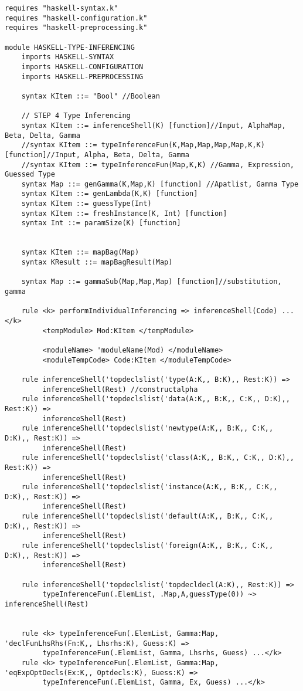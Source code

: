 \begin{lstlisting}
requires "haskell-syntax.k"
requires "haskell-configuration.k"
requires "haskell-preprocessing.k"

module HASKELL-TYPE-INFERENCING
    imports HASKELL-SYNTAX
    imports HASKELL-CONFIGURATION
    imports HASKELL-PREPROCESSING

    syntax KItem ::= "Bool" //Boolean

    // STEP 4 Type Inferencing
    syntax KItem ::= inferenceShell(K) [function]//Input, AlphaMap, Beta, Delta, Gamma
    //syntax KItem ::= typeInferenceFun(K,Map,Map,Map,Map,K,K) [function]//Input, Alpha, Beta, Delta, Gamma
    //syntax KItem ::= typeInferenceFun(Map,K,K) //Gamma, Expression, Guessed Type
    syntax Map ::= genGamma(K,Map,K) [function] //Apatlist, Gamma Type
    syntax KItem ::= genLambda(K,K) [function]
    syntax KItem ::= guessType(Int)
    syntax KItem ::= freshInstance(K, Int) [function]
    syntax Int ::= paramSize(K) [function]


    syntax KItem ::= mapBag(Map)
    syntax KResult ::= mapBagResult(Map)

    syntax Map ::= gammaSub(Map,Map,Map) [function]//substitution, gamma

    rule <k> performIndividualInferencing => inferenceShell(Code) ...</k>
         <tempModule> Mod:KItem </tempModule>

         <moduleName> 'moduleName(Mod) </moduleName>
         <moduleTempCode> Code:KItem </moduleTempCode>

    rule inferenceShell('topdeclslist('type(A:K,, B:K),, Rest:K)) =>
         inferenceShell(Rest) //constructalpha
    rule inferenceShell('topdeclslist('data(A:K,, B:K,, C:K,, D:K),, Rest:K)) =>
         inferenceShell(Rest)
    rule inferenceShell('topdeclslist('newtype(A:K,, B:K,, C:K,, D:K),, Rest:K)) =>
         inferenceShell(Rest)
    rule inferenceShell('topdeclslist('class(A:K,, B:K,, C:K,, D:K),, Rest:K)) =>
         inferenceShell(Rest)
    rule inferenceShell('topdeclslist('instance(A:K,, B:K,, C:K,, D:K),, Rest:K)) =>
         inferenceShell(Rest)
    rule inferenceShell('topdeclslist('default(A:K,, B:K,, C:K,, D:K),, Rest:K)) =>
         inferenceShell(Rest)
    rule inferenceShell('topdeclslist('foreign(A:K,, B:K,, C:K,, D:K),, Rest:K)) =>
         inferenceShell(Rest)

    rule inferenceShell('topdeclslist('topdecldecl(A:K),, Rest:K)) =>
         typeInferenceFun(.ElemList, .Map,A,guessType(0)) ~> inferenceShell(Rest)


    rule <k> typeInferenceFun(.ElemList, Gamma:Map, 'declFunLhsRhs(Fn:K,, Lhsrhs:K), Guess:K) =>
         typeInferenceFun(.ElemList, Gamma, Lhsrhs, Guess) ...</k>
    rule <k> typeInferenceFun(.ElemList, Gamma:Map, 'eqExpOptDecls(Ex:K,, Optdecls:K), Guess:K) =>
         typeInferenceFun(.ElemList, Gamma, Ex, Guess) ...</k>
\end{lstlisting}

